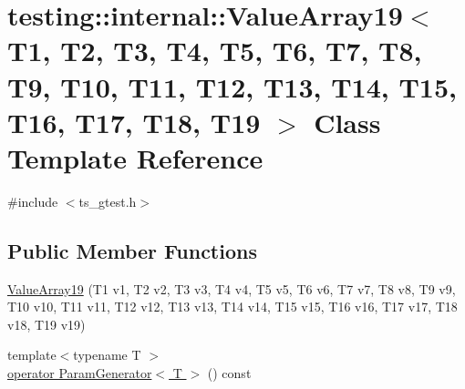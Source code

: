 \hypertarget{classtesting_1_1internal_1_1ValueArray19}{\section{testing\-:\-:internal\-:\-:Value\-Array19$<$ T1, T2, T3, T4, T5, T6, T7, T8, T9, T10, T11, T12, T13, T14, T15, T16, T17, T18, T19 $>$ Class Template Reference}
\label{classtesting_1_1internal_1_1ValueArray19}
}


{\ttfamily \#include $<$ts\-\_\-gtest.\-h$>$}

\subsection*{Public Member Functions}
\begin{DoxyCompactItemize}
\item 
\hyperlink{classtesting_1_1internal_1_1ValueArray19_a1ffcdacd1ffb1d6718187a66458c09e2}{Value\-Array19} (T1 v1, T2 v2, T3 v3, T4 v4, T5 v5, T6 v6, T7 v7, T8 v8, T9 v9, T10 v10, T11 v11, T12 v12, T13 v13, T14 v14, T15 v15, T16 v16, T17 v17, T18 v18, T19 v19)
\item 
{\footnotesize template$<$typename T $>$ }\\\hyperlink{classtesting_1_1internal_1_1ValueArray19_a751bbba276df0707d1f48ca28677e22f}{operator Param\-Generator$<$ T $>$} () const 
\end{DoxyCompactItemize}


